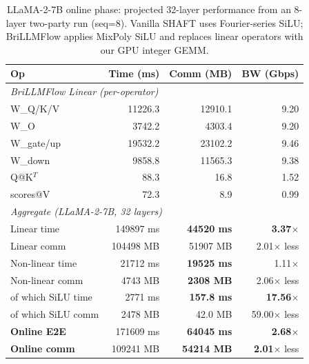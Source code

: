 \begin{table}[t]
\centering
\caption{LLaMA-2-7B online phase: projected 32-layer performance from an
8-layer two-party run (seq=8). Vanilla SHAFT uses Fourier-series SiLU;
BriLLMFlow applies MixPoly SiLU and replaces linear operators with our GPU
integer GEMM.}
\label{tab:llama2_hybrid_comparison}
\setlength{\tabcolsep}{6pt}
\footnotesize
\begin{tabular}{lrrr}
\toprule
\textbf{Op} & \textbf{Time (ms)} & \textbf{Comm (MB)} & \textbf{BW (Gbps)} \\
\midrule
\multicolumn{4}{l}{\textit{BriLLMFlow Linear (per-operator)}} \\
W\_Q/K/V    & 11226.3 & 12910.1 & 9.20 \\
W\_O        & 3742.2  & 4303.4  & 9.20 \\
W\_gate/up  & 19532.2 & 23102.2 & 9.46 \\
W\_down     & 9858.8  & 11565.3 & 9.38 \\
Q@K$^T$     & 88.3    & 16.8    & 1.52 \\
scores@V    & 72.3    & 8.9     & 0.99 \\
\midrule
\multicolumn{4}{l}{\textit{Aggregate (LLaMA-2-7B, 32 layers)}} \\
Linear time       & 149897 ms & \textbf{44520 ms} & \textbf{3.37}$\times$ \\
Linear comm       & 104498 MB & 51907 MB          & 2.01$\times$ less \\
Non-linear time   & 21712 ms  & \textbf{19525 ms} & 1.11$\times$ \\
Non-linear comm   & 4743 MB   & \textbf{2308 MB}  & 2.06$\times$ less \\
\quad of which SiLU time & 2771 ms & \textbf{157.8 ms} & \textbf{17.56}$\times$ \\
\quad of which SiLU comm & 2478 MB & 42.0 MB & 59.00$\times$ less \\
\midrule
\textbf{Online E2E}  & 171609 ms & \textbf{64045 ms} & \textbf{2.68}$\times$ \\
\textbf{Online comm} & 109241 MB & \textbf{54214 MB} & \textbf{2.01}$\times$ less \\
\bottomrule
\end{tabular}
\end{table}
